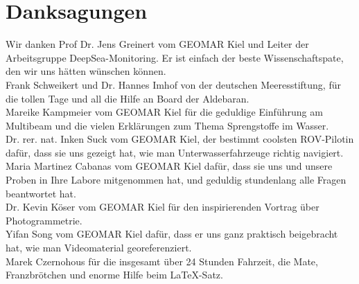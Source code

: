  

\chapter[Danksagungen]{Danksagungen}
Wir danken Prof Dr. Jens Greinert vom GEOMAR Kiel und Leiter der Arbeitsgruppe DeepSea-Monitoring. Er ist einfach der beste Wissenschaftspate, den wir uns hätten wünschen können.\\



Frank Schweikert und Dr. Hannes Imhof von der deutschen Meeresstiftung, für die tollen Tage und all die Hilfe an Board der Aldebaran. \\



Mareike Kampmeier vom GEOMAR Kiel für die geduldige Einführung am Multibeam und die vielen Erklärungen zum Thema Sprengstoffe im Wasser. \\



Dr. rer. nat. Inken Suck vom GEOMAR Kiel, der bestimmt coolsten ROV-Pilotin dafür, dass sie uns gezeigt hat, wie man Unterwasserfahrzeuge richtig navigiert. \\



Maria Martinez Cabanas vom GEOMAR Kiel dafür, dass sie uns und unsere Proben in Ihre Labore mitgenommen hat, und geduldig stundenlang alle Fragen beantwortet hat.\\



Dr. Kevin Köser vom GEOMAR Kiel für den inspirierenden Vortrag über Photogrammetrie. \\



Yifan Song vom GEOMAR Kiel dafür, dass er uns ganz praktisch beigebracht hat, wie man Videomaterial georeferenziert.\\



Marek Czernohous für die insgesamt über 24 Stunden Fahrzeit, die Mate, Franzbrötchen und enorme Hilfe beim \LaTeX -Satz.\\
